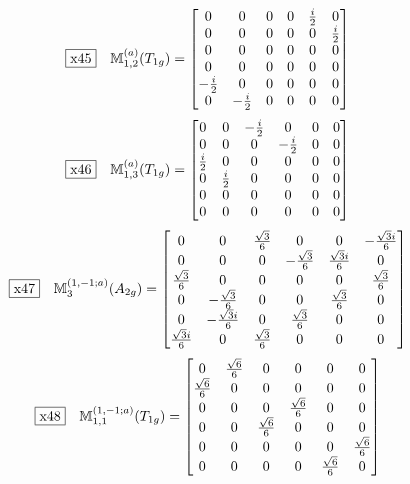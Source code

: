 \documentclass[fleqn,10pt,landscape]{jsarticle}
\begin{document}
\begin{dmath*}
\fbox{x45}\quad \mathbb{M}_{1,2}^{(a)}(T_{1g})=\begin{bmatrix} 0 & 0 & 0 & 0 & \frac{i}{2} & 0 \\ 0 & 0 & 0 & 0 & 0 & \frac{i}{2} \\ 0 & 0 & 0 & 0 & 0 & 0 \\ 0 & 0 & 0 & 0 & 0 & 0 \\ - \frac{i}{2} & 0 & 0 & 0 & 0 & 0 \\ 0 & - \frac{i}{2} & 0 & 0 & 0 & 0 \end{bmatrix}
\end{dmath*}
\begin{dmath*}
\fbox{x46}\quad \mathbb{M}_{1,3}^{(a)}(T_{1g})=\begin{bmatrix} 0 & 0 & - \frac{i}{2} & 0 & 0 & 0 \\ 0 & 0 & 0 & - \frac{i}{2} & 0 & 0 \\ \frac{i}{2} & 0 & 0 & 0 & 0 & 0 \\ 0 & \frac{i}{2} & 0 & 0 & 0 & 0 \\ 0 & 0 & 0 & 0 & 0 & 0 \\ 0 & 0 & 0 & 0 & 0 & 0 \end{bmatrix}
\end{dmath*}
\begin{dmath*}
\fbox{x47}\quad \mathbb{M}_{3}^{(1,-1;a)}(A_{2g})=\begin{bmatrix} 0 & 0 & \frac{\sqrt{3}}{6} & 0 & 0 & - \frac{\sqrt{3} i}{6} \\ 0 & 0 & 0 & - \frac{\sqrt{3}}{6} & \frac{\sqrt{3} i}{6} & 0 \\ \frac{\sqrt{3}}{6} & 0 & 0 & 0 & 0 & \frac{\sqrt{3}}{6} \\ 0 & - \frac{\sqrt{3}}{6} & 0 & 0 & \frac{\sqrt{3}}{6} & 0 \\ 0 & - \frac{\sqrt{3} i}{6} & 0 & \frac{\sqrt{3}}{6} & 0 & 0 \\ \frac{\sqrt{3} i}{6} & 0 & \frac{\sqrt{3}}{6} & 0 & 0 & 0 \end{bmatrix}
\end{dmath*}
\begin{dmath*}
\fbox{x48}\quad \mathbb{M}_{1,1}^{(1,-1;a)}(T_{1g})=\begin{bmatrix} 0 & \frac{\sqrt{6}}{6} & 0 & 0 & 0 & 0 \\ \frac{\sqrt{6}}{6} & 0 & 0 & 0 & 0 & 0 \\ 0 & 0 & 0 & \frac{\sqrt{6}}{6} & 0 & 0 \\ 0 & 0 & \frac{\sqrt{6}}{6} & 0 & 0 & 0 \\ 0 & 0 & 0 & 0 & 0 & \frac{\sqrt{6}}{6} \\ 0 & 0 & 0 & 0 & \frac{\sqrt{6}}{6} & 0 \end{bmatrix}
\end{dmath*}
\end{document}
